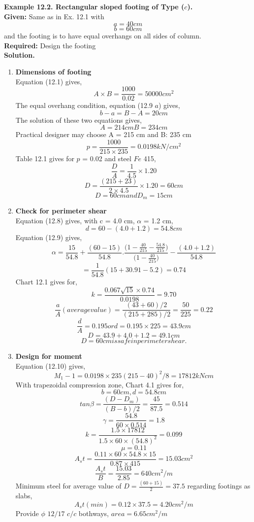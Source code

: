 \documentclass{report}
\begin{document}
\textbf{ Example 12.2. Rectangular sloped footing of Type ($c$).}\\
\textbf{Given:}
Same as in Ex. 12.1 with
$$a = 40 cm$$
$$b = 60 cm$$ 
and the footing is to have equal overhangs on all sides of column.\\
\textbf{Required:} Design the footing\\
\textbf{Solution.}
\begin{enumerate}
\item   \textbf{Dimensions of footing}\\
  Equation (12.1) gives,
  $$ A\times B= \frac{1000}{0.02}=50000 cm^2$$
  The equal overhang condition, equation (12.9 $a$) gives,
  $$ b-a=B-A=20 cm$$
  The solution of these two equations gives,
  $$A=214 cm B=234 cm$$
  Practical designer may choose A = 215 cm and B: 235 cm
  $$p=\frac{1000}{215\times235}=0.0198  kN/cm^2$$
  Table 12.1 gives for $p$ = 0.02 and steel $Fe$ 415,
 $$\frac{D}{A}=\frac{1}{4.5}\times1.20$$
 $$D=\frac{(215+23)}{2 \times 4.5} \times 1.20=60cm$$
 $$D=60cm and D_m=15cm$$
 
\item  \textbf{Check for perimeter shear}\\
 Equation (12.8) gives, with c = 4.0 cm, $\alpha$ = 1.2 cm,
 $$d=60-(4.0+1.2)=54.8cm$$
 Equation (12.9) gives,
 $$ \alpha=\frac{15}{54.8}+\frac{(60-15)}{54.8}.\frac{\Bigg(1-\frac{40}{215}-\frac{54.8}{215}\Bigg)}{\Bigg(1-\frac{40}{215}\Bigg)}-\frac{(4.0+1.2)}{54.8}$$
 $$=\frac{1}{54.8}(15+30.91-5.2)=0.74$$
 Chart 12.1 gives for,
 $$ k=\frac{0.067\sqrt{15}\times0.74}{0.0198}=9.70$$
 $$\frac{a}{A}(average value)=\frac{(43+60)/2}{(215+285)/2}=\frac{50}{225}=0.22$$
 $$\frac{d}{A}=0.195 or d=0.195\times225=43.9 cm$$
 $$D=43.9+4.0+1.2=49.1 cm$$
 $$D=60cm is safe in perimeter shear.$$
 
\item  \textbf{Design for moment}\\
   Equation (12.10) gives,
   $$M_1-1=0.0198 \times 235(215-40)^2/8=17812 kN cm$$
   With trapezoidal compression zone, Chart 4.1 gives for,
   $$b=60cm, d=54.8 cm$$
   $$tan\beta =\frac{(D-D_m)}{(B-b)/2}=\frac{45}{87.5}=0.514$$
   $$\gamma=\frac{54.8}{60\times0.514}=1.8$$
   $$k=\frac{1.5 \times 17812}{1.5 \times 60 \times (54.8)^2}=0.099$$
   $$\mu=0.11$$
   $$A_st=\frac{0.11 \times 60 \times 54.8 \times 15}{0.87 \times 415}=15.03cm^2$$
   $$\frac{A_st}{B}=\frac{15.03}{2.85}=640 cm^2/m$$
  Minimum steel for average value of $D =\frac{(60+15)}{2}=37.5$ regarding footings as slabs,
  $$A_st(min)=0.12\times 37.5=4.20 cm^2/m$$
  Provide $\phi$ $12/17$ $c/c$ bothways, $area=6.65 cm^2/m$
  

\end{enumerate}
\end{document}
